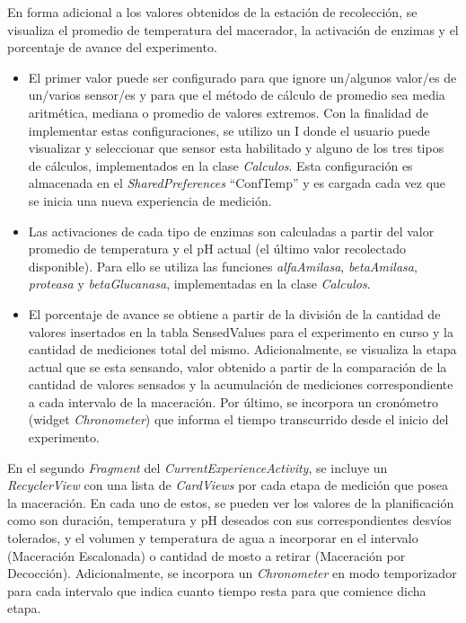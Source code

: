            \par En forma adicional a los valores obtenidos de la estación de recolección, se visualiza el promedio de temperatura del macerador, la activación de enzimas y el porcentaje de avance del experimento. 
            \begin{itemize}
                \item El primer valor puede ser configurado para que ignore un/algunos valor/es de un/varios sensor/es y para que el método de cálculo de promedio sea media aritmética, mediana o promedio de valores extremos. Con la finalidad de implementar estas configuraciones, se utilizo un I donde el usuario puede visualizar y seleccionar que sensor esta habilitado y alguno de los tres tipos de cálculos, implementados en la clase \textit{Calculos}. Esta configuración es almacenada en el \textit{SharedPreferences} ``ConfTemp'' y es cargada cada vez que se inicia una nueva experiencia de medición. 
                
                \item Las activaciones de cada tipo de enzimas son calculadas a partir del valor promedio de temperatura y el pH actual (el último valor recolectado disponible). Para ello se utiliza las funciones \textit{alfaAmilasa}, \textit{betaAmilasa}, \textit{proteasa} y \textit{betaGlucanasa}, implementadas en la clase \textit{Calculos}. 
                
                \item El porcentaje de avance se obtiene a partir de la división de la cantidad de valores insertados en la tabla SensedValues para el experimento en curso y la cantidad de mediciones total del mismo. Adicionalmente, se visualiza la etapa actual que se esta sensando, valor obtenido a partir de la comparación de la cantidad de valores sensados y la acumulación de mediciones correspondiente a cada intervalo de la maceración. Por último, se incorpora un cronómetro (widget \textit{Chronometer}) que informa el tiempo transcurrido desde el inicio del experimento.
            \end{itemize}
            
            \par En el segundo \textit{Fragment} del \textit{CurrentExperienceActivity}, se incluye un \textit{RecyclerView} con una lista de \textit{CardViews} por cada etapa de medición que posea la maceración. En cada uno de estos, se pueden ver los valores de la planificación como son duración, temperatura y pH deseados con sus correspondientes desvíos tolerados, y el volumen y temperatura de agua a incorporar en el intervalo (Maceración Escalonada) o cantidad de mosto a retirar (Maceración por Decocción). Adicionalmente, se incorpora un \textit{Chronometer} en modo temporizador para cada intervalo que indica cuanto tiempo resta para que comience dicha etapa.
            
